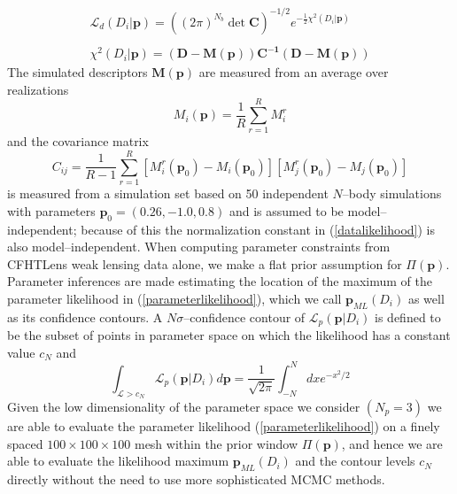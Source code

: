 \documentclass[reprint,aps,prd,superscriptaddress,showkeys]{revtex4-1}
\begin{document}
\begin{equation}
\label{datalikelihood}
\begin{matrix}
\mathcal{L}_d(D_i\vert \mathbf{p}) = ((2\pi)^{N_b}\det{\mathbf{C}})^{-1/2} e^{-\frac{1}{2}\chi^2(D_i\vert \mathbf{p})} \\ \\
\chi^2(D_i\vert \mathbf{p}) = \mathbf{(D - M(p))C^{-1}(D-M(p))}
\end{matrix}
\end{equation} 
%
The simulated descriptors $\mathbf{M(p)}$ are measured from an average over realizations
\begin{equation}
M_i(\mathbf{p}) = \frac{1}{R}\sum_{r=1}^R M_i^r 
\end{equation}
%
and the covariance matrix 
\begin{equation}
C_{ij} = \frac{1}{R-1} \sum_{r=1}^R [M_i^r(\mathbf{p}_0)-M_i(\mathbf{p}_0)][M_j^r(\mathbf{p}_0)-M_j(\mathbf{p}_0)]
\end{equation}
%
is measured from a simulation set based on 50 independent $N$--body simulations with parameters $\mathbf{p}_0=(0.26,-1.0,0.8)$ and is assumed to be model--independent; because of this the normalization constant in (\ref{datalikelihood}) is also model--independent. When computing parameter constraints from CFHTLens weak lensing data alone, we make a flat prior assumption for $\Pi(\mathbf{p})$. Parameter inferences are made estimating the location of the maximum of the parameter likelihood in (\ref{parameterlikelihood}), which we call $\mathbf{p}_{ML}(D_i)$ as well as its confidence contours. A $N\sigma$--confidence contour of $\mathcal{L}_p(\mathbf{p}\vert D_i)$ is defined to be the subset of points in parameter space on which the likelihood has a constant value $c_N$ and 
\begin{equation}
\int_{\mathcal{L}>c_N} \mathcal{L}_p(\mathbf{p}\vert D_i) d\mathbf{p} = \frac{1}{\sqrt{2\pi}}\int_{-N}^N dx e^{-x^2/2}
\end{equation}
%
Given the low dimensionality of the parameter space we consider $(N_p=3)$ we are able to evaluate the parameter likelihood (\ref{parameterlikelihood}) on a finely spaced $100\times100\times100$ mesh within the prior window $\Pi(\mathbf{p})$, and hence we are able to evaluate the likelihood maximum $\mathbf{p}_{ML}(D_i)$ and the contour levels $c_N$ directly without the need to use more sophisticated MCMC methods.

\end{document}
